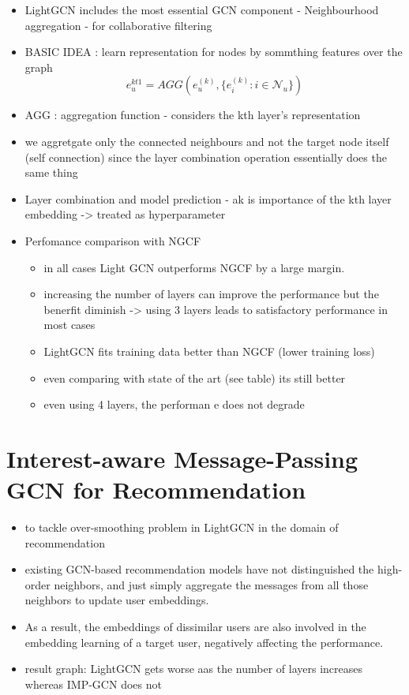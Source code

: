 \documentclass{report}
\begin{document}
\begin{itemize}
\begin{itemize}
    \end{itemize}
    \item LightGCN includes the most essential GCN component - Neighbourhood aggregation - for collaborative filtering
    \item BASIC IDEA : learn representation for nodes by sommthing features over the graph $$ e_{u}^{kt1} = AGG(e_u^{(k)},\{e_i^{(k)}:i\in \mathcal{N}_u\})$$
    \item AGG : aggregation function - considers the kth layer's representation 
    \item we aggretgate only the connected neighbours and not the target node itself (self connection) since the layer combination operation essentially does the same thing
    \item Layer combination and model prediction - ak is importance of the kth layer embedding -> treated as hyperparameter
    \item Perfomance comparison with NGCF
    \begin{itemize}
        \item in all cases Light GCN outperforms NGCF by a large margin.
        \item increasing the number of layers can improve the performance but the benerfit diminish -> using 3 layers leads to satisfactory performance in most cases
        \item LightGCN fits training data better than NGCF (lower training loss)
        \item  even comparing with state of the art (see table) its still better
        \item even using 4 layers, the performan e does not degrade
    \end{itemize}
\end{itemize}
 \section{Interest-aware Message-Passing GCN for Recommendation}
 \begin{itemize}
    \item to tackle over-smoothing problem in LightGCN in the domain of recommendation
    \item existing GCN-based recommendation models have not distinguished the high-order neighbors, and just simply aggregate the messages from all those neighbors to update user embeddings. 
    \item As a result, the embeddings of dissimilar users are also involved in the embedding learning of a target user, negatively affecting the performance.
    \item result graph: LightGCN gets worse aas the number of layers increases whereas IMP-GCN does not
 \end{itemize}
\end{document}
